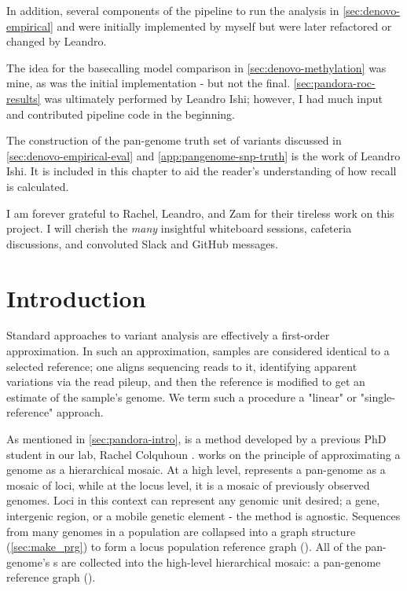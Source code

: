 In addition, several components of the pipeline to run the analysis in \autoref{sec:denovo-empirical} and \cite{pandora} were initially implemented by myself but were later refactored or changed by Leandro.

The idea for the \ont{} basecalling model comparison in \autoref{sec:denovo-methylation} was mine, as was the initial implementation - but not the final. \autoref{sec:pandora-roc-results} was ultimately performed by Leandro Ishi; however, I had much input and contributed pipeline code in the beginning.

The construction of the pan-genome truth set of variants discussed in \autoref{sec:denovo-empirical-eval} and \autoref{app:pangenome-snp-truth} is the work of Leandro Ishi. It is included in this chapter to aid the reader's understanding of how recall is calculated.

I am forever grateful to Rachel, Leandro, and Zam for their tireless work on this project. I will cherish the \emph{many} insightful whiteboard sessions, cafeteria discussions, and convoluted Slack and GitHub messages.

\section{Introduction}

Standard approaches to variant analysis are effectively a first-order approximation. In such an approximation, samples are considered identical to a selected reference; one aligns sequencing reads to it, identifying apparent variations via the read pileup, and then the reference is modified to get an estimate of the sample's genome. We term such a procedure a "linear" or "single-reference" approach. 

As mentioned in \autoref{sec:pandora-intro}, \pandora{} is a method developed by a previous PhD student in our lab, Rachel Colquhoun \cite{rachelthesis}. \pandora{} works on the principle of approximating a genome as a hierarchical mosaic. At a high level, \pandora{} represents a pan-genome as a mosaic of loci, while at the locus level, it is a mosaic of previously observed genomes. Loci in this context can represent any genomic unit desired; a gene, intergenic region, or a mobile genetic element - the method is agnostic. Sequences from many genomes in a population are collapsed into a graph structure (\autoref{sec:make_prg}) to form a locus population reference graph (\prg{}). All of the pan-genome's \prg{}s are collected into the high-level hierarchical mosaic: a pan-genome reference graph (\panrg{}).

